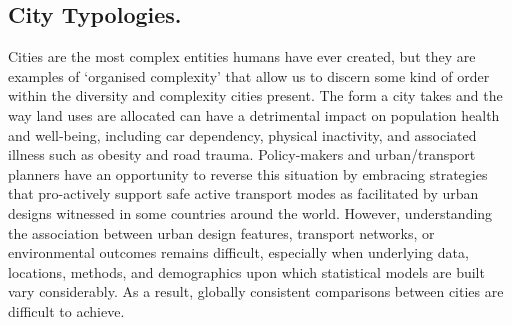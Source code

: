 \documentclass{nature}
\begin{document}




\subsection{City Typologies.}\label{sec:introduction2}
Cities are the most complex entities humans have ever created, but they are examples of `organised complexity' that allow us to discern some kind of order within the diversity and complexity cities present\cite{Kropf2014}. The form a city takes and the way land uses are allocated can have a detrimental impact on population health and well-being, including car dependency, physical inactivity, and associated illness such as obesity and road trauma\cite{Giles-corti2016,Kleinert2016,Goenka2016,Zapata-Diomedi2017,Heesch2014,Daley2011, Cepeda2016,MingWen2008,Norman2006,Thompson2018b}. Policy-makers and urban/transport planners have an opportunity to reverse this situation by embracing strategies that pro-actively support safe active transport modes as facilitated by urban designs witnessed in some countries around the world. However, understanding the association between urban design features, transport networks, or environmental outcomes remains difficult, especially when underlying data, locations, methods, and demographics upon which statistical models are built vary considerably. As a result, globally consistent comparisons between cities are difficult to achieve. 
\end{document}
